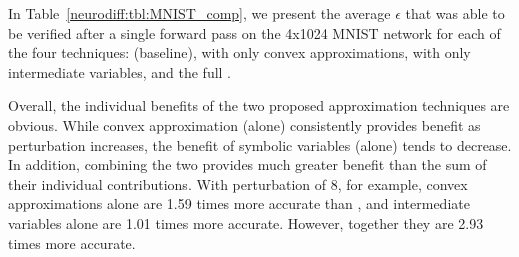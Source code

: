 In Table~\ref{neurodiff:tbl:MNIST_comp}, we present the average $ \epsilon $
that was able to be verified after a single forward pass on the
4x1024 MNIST network for each of
the four techniques: \ReluDiffP{} (baseline), \Name{} with only convex
approximations, \Name{} with only intermediate variables, and the
full \Name{}.


Overall, the individual benefits of the two proposed approximation
techniques are obvious.  While convex approximation
(alone) consistently provides benefit as perturbation increases, the
benefit of symbolic variables (alone) tends to decrease.
%
In addition, combining the two provides much greater benefit than the
sum of their individual contributions. With perturbation of 8, for
example, convex approximations alone are 1.59 times more accurate than
\ReluDiffP{}, and intermediate variables alone are 1.01 times more accurate.
However, together they are 2.93 times more accurate.


\begin{table}
	\centering
	\caption{Evaluating the individual contributions of convex approximation and symbolic variables using the  MNIST 4x1024 global perturbation experiment.}
	\label{neurodiff:tbl:MNIST_comp}
\end{table}


